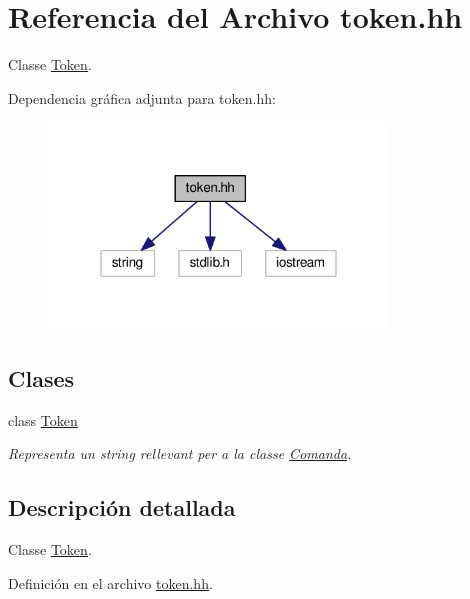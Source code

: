 \hypertarget{token_8hh}{\section{Referencia del Archivo token.\-hh}
\label{token_8hh}
}


Classe \hyperlink{class_token}{Token}.  


Dependencia gráfica adjunta para token.\-hh\-:
\nopagebreak
\begin{figure}[H]
\begin{center}
\leavevmode
\includegraphics[width=256pt]{token_8hh__incl}
\end{center}
\end{figure}
\subsection*{Clases}
\begin{DoxyCompactItemize}
\item 
class \hyperlink{class_token}{Token}
\begin{DoxyCompactList}\small\item\em Representa un string rellevant per a la classe \hyperlink{class_comanda}{Comanda}. \end{DoxyCompactList}\end{DoxyCompactItemize}


\subsection{Descripción detallada}
Classe \hyperlink{class_token}{Token}. 

Definición en el archivo \hyperlink{token_8hh_source}{token.\-hh}.

